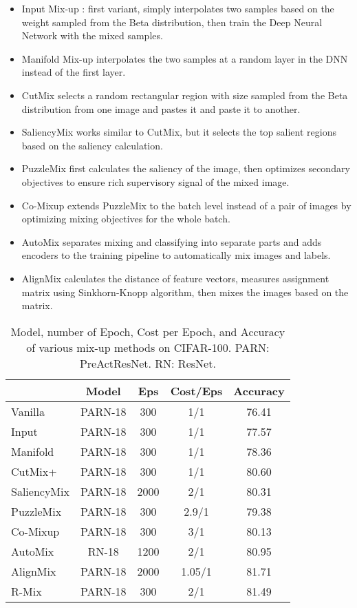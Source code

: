 \documentclass[letterpaper]{article} \usepackage[submission]{aaai23}  \usepackage{times}  \usepackage{helvet}  \usepackage{courier}  \usepackage[hyphens]{url}  \usepackage{graphicx} \urlstyle{rm} \def\UrlFont{\rm}  \usepackage{natbib}  \usepackage{caption} \frenchspacing  \setlength{\pdfpagewidth}{8.5in} \setlength{\pdfpageheight}{11in}
\begin{document}
\begin{itemize}
    \item Input Mix-up \cite{zhang2018mixup}: first variant, simply interpolates two samples based on the weight sampled from the Beta distribution, then train the Deep Neural Network with the mixed samples.
    \item Manifold Mix-up \cite{verma2019manifold} interpolates the two samples at a random layer in the DNN instead of the first layer.
    \item CutMix \cite{yun2019cutmix} selects a random rectangular region with size sampled from the Beta distribution from one image and pastes it and paste it to another.
    \item SaliencyMix \cite{uddin2021saliencymix} works similar to CutMix, but it selects the top salient regions based on the saliency calculation.
    \item PuzzleMix \cite{kim2020puzzlemix} first calculates the saliency of the image, then optimizes secondary objectives to ensure rich supervisory signal of the mixed image.
    \item Co-Mixup \cite{kim2021comixup} extends PuzzleMix to the batch level instead of a pair of images by optimizing mixing objectives for the whole batch. 
    \item AutoMix \cite{mixup10} separates mixing and classifying into separate parts and adds encoders to the training pipeline to automatically mix images and labels.
    \item AlignMix \cite{mixup9} calculates the distance of feature vectors, measures assignment matrix using Sinkhorn-Knopp algorithm, then mixes the images based on the matrix.
\end{itemize}

\begin{table}[h!]
\centering
\begin{tabular}{lcccc}
\hline
 & Model & Eps & Cost/Eps & Accuracy \\ \hline
 Vanilla & PARN-18 & 300 & 1/1 & 76.41 \\
Input & PARN-18 & 300 & 1/1 & 77.57 \\
Manifold & PARN-18 & 300 & 1/1 & 78.36 \\
CutMix+ & PARN-18 & 300 & 1/1 & 80.60 \\
SaliencyMix & PARN-18 & 2000 & 2/1 & 80.31 \\
PuzzleMix & PARN-18 & 300 & 2.9/1 & 79.38 \\
Co-Mixup & PARN-18 & 300 & 3/1 & 80.13 \\
AutoMix & RN-18 & 1200 & 2/1 & 80.95 \\
AlignMix & PARN-18 & 2000 & 1.05/1 & 81.71 \\ \hline
R-Mix & PARN-18 & 300 & 2/1 & 81.49 \\ \hline
\end{tabular}
\caption{Model, number of Epoch, Cost per Epoch, and Accuracy of various mix-up methods on CIFAR-100. PARN: PreActResNet. RN: ResNet.}
\label{tab:cifar}
\end{table}
\end{document}

